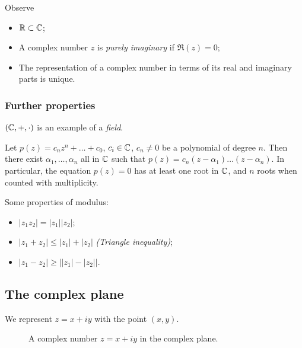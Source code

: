 \documentclass{../../template/note}
\begin{document}
    \begin{remark*}
        Observe
        \begin{itemize}
            \item \(\mathbb R \subset \mathbb C\);
            \item A complex number \(z\) is \emph{purely imaginary} if \(\Re(z) = 0\);
            \item The representation of a complex number in terms of its real and imaginary parts is unique.
        \end{itemize}
    \end{remark*}
    
    \subsubsection{Further properties}

    \((\mathbb C, +, \cdot)\) is an example of a \emph{field}.

    \begin{theorem}
        Let \(p(z) = c_nz^n + \dots + c_0\), \(c_i \in \mathbb C\), \(c_n \neq 0\) be a polynomial of degree \(n\). Then there exist \(\alpha_1, \dots, \alpha_n\) all in \(\mathbb C\) such that \(p(z) = c_n(z-\alpha_1)\dots(z-\alpha_n)\). In particular, the equation \(p(z)=0\) has at least one root in \(\mathbb C\), and \(n\) roots when counted with multiplicity.
        \label{fta}
    \end{theorem}

    \noindent Some properties of modulus:

    \begin{itemize}
        \item \(|z_1z_2| = |z_1||z_2|\);
        \item \(|z_1 + z_2| \leq |z_1| + |z_2|\) \emph{(Triangle inequality)};
        \item \(|z_1 - z_2| \geq \left||z_1|-|z_2|\right|\).
    \end{itemize}

    \subsection{The complex plane}

    We represent \(z = x+iy\) with the point \((x, y)\).

    \begin{figure}[ht]
        \centering
        \caption{A complex number \(z = x+iy\) in the complex plane.}
        \label{fig:argand-basic}
    \end{figure}
    
\end{document}
